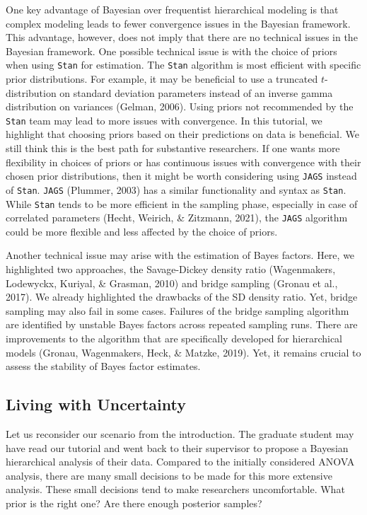 \documentclass[
  english,
  doc,floatsintext]{apa6}
\begin{document}
One key advantage of Bayesian over frequentist hierarchical modeling is that complex modeling leads to fewer convergence issues in the Bayesian framework. This advantage, however, does not imply that there are no technical issues in the Bayesian framework. One possible technical issue is with the choice of priors when using \texttt{Stan} for estimation. The \texttt{Stan} algorithm is most efficient with specific prior distributions. For example, it may be beneficial to use a truncated \(t\)-distribution on standard deviation parameters instead of an inverse gamma distribution on variances (Gelman, 2006). Using priors not recommended by the \texttt{Stan} team may lead to more issues with convergence. In this tutorial, we highlight that choosing priors based on their predictions on data is beneficial. We still think this is the best path for substantive researchers. If one wants more flexibility in choices of priors or has continuous issues with convergence with their chosen prior distributions, then it might be worth considering using \texttt{JAGS} instead of \texttt{Stan}. \texttt{JAGS} (Plummer, 2003) has a similar functionality and syntax as \texttt{Stan}. While \texttt{Stan} tends to be more efficient in the sampling phase, especially in case of correlated parameters (Hecht, Weirich, \& Zitzmann, 2021), the \texttt{JAGS} algorithm could be more flexible and less affected by the choice of priors.

Another technical issue may arise with the estimation of Bayes factors. Here, we highlighted two approaches, the Savage-Dickey density ratio (Wagenmakers, Lodewyckx, Kuriyal, \& Grasman, 2010) and bridge sampling (Gronau et al., 2017). We already highlighted the drawbacks of the SD density ratio. Yet, bridge sampling may also fail in some cases. Failures of the bridge sampling algorithm are identified by unstable Bayes factors across repeated sampling runs. There are improvements to the algorithm that are specifically developed for hierarchical models (Gronau, Wagenmakers, Heck, \& Matzke, 2019). Yet, it remains crucial to assess the stability of Bayes factor estimates.

\hypertarget{living-with-uncertainty}{%
\subsection{Living with Uncertainty}\label{living-with-uncertainty}}

Let us reconsider our scenario from the introduction. The graduate student may have read our tutorial and went back to their supervisor to propose a Bayesian hierarchical analysis of their data. Compared to the initially considered ANOVA analysis, there are many small decisions to be made for this more extensive analysis. These small decisions tend to make researchers uncomfortable. What prior is the right one? Are there enough posterior samples?
\end{document}
